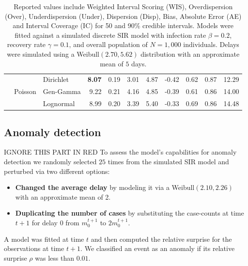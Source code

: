 \documentclass[12pt]{article}
\begin{document}
\begin{table}[!htb]
\begin{tabular}{>{\raggedleft\arraybackslash}p{0.45in}|r | >{\raggedleft\arraybackslash}p{0.85in} | r r r r r r r r}
\\

& \multirow{3}{*}{Poisson}
& \cellcolor{delayC!25}Dirichlet & \cellcolor{delayC!25}\bf  8.07 & \cellcolor{delayC!25}0.19 & \cellcolor{delayC!25}3.01 & \cellcolor{delayC!25}4.87 & \cellcolor{delayC!25}-0.42 & \cellcolor{delayC!25}0.62 & \cellcolor{delayC!25}0.87 & \cellcolor{delayC!25}12.29 \\
& & \cellcolor{delayB!25}Gen-Gamma & \cellcolor{delayB!25}9.22 & \cellcolor{delayB!25}0.21 & \cellcolor{delayB!25}4.16 & \cellcolor{delayB!25}4.85 & \cellcolor{delayB!25}-0.39 & \cellcolor{delayB!25}0.61 & \cellcolor{delayB!25}0.86 & \cellcolor{delayB!25}14.00 \\
& & \cellcolor{delayA!25}Lognormal & \cellcolor{delayA!25}8.99 & \cellcolor{delayA!25}0.20 & \cellcolor{delayA!25}3.39 & \cellcolor{delayA!25}5.40 & \cellcolor{delayA!25}-0.33 & \cellcolor{delayA!25}0.69 & \cellcolor{delayA!25}0.86 & \cellcolor{delayA!25}14.48 \\

\bottomrule
\end{tabular}
\caption*{\tiny Reported values include Weighted Interval Scoring (WIS), Overdispersion (Over), Underdispersion (Under), Dispersion (Disp), Bias, Absolute Error (AE) and Interval Coverage (IC) for 50 and 90\% credible intervals. Models were fitted against a simulated discrete SIR model with infection rate $\beta = 0.2$, recovery rate $\gamma = 0.1$, and overall population of $N = 1,000$ individuals. Delays were simulated using a Weibull$(2.70, 5.62)$ distribution with an approximate mean of $5$ days.}
\label{tab:wissim}
\end{table}

{\color{red}
\subsection{Anomaly detection}
{\Large IGNORE THIS PART IN RED}
To assess the model's capabilities for anomaly detection we randomly selected $25$ times from the simulated SIR model and perturbed via two different options:
\begin{itemize}
    \item \textbf{Changed the average delay} by modeling it via a Weibull$(2.10, 2.26)$ with an approximate mean of 2.
    \item \textbf{Duplicating the number of cases} by substituting the case-counts at time $t + 1$ for delay $0$ from $m_0^{t+1}$ to $2m_0^{t+1}$.     
\end{itemize}
A model was fitted at time $t$ and then computed the relative surprise for the observations at time $t+1$. 
We classified an event as an anomaly if its relative surprise $\rho$ was less than $0.01$. 
}
\end{document}

